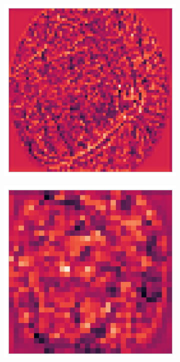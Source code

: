 \begin{figure}
\begin{subfigure}[b]{0.19\textwidth}
    \end{subfigure}
    \hfill
          \begin{subfigure}[b]{0.19\textwidth}
         \centering
         \includegraphics[width=\textwidth, height=\textwidth]{figures/chapter6/features/10988_left/10988_left_2.png}
    \end{subfigure}
    \hfill
    \begin{subfigure}[b]{0.19\textwidth}
         \centering
         \includegraphics[width=\textwidth, height=\textwidth]{figures/chapter6/features/10988_left/10988_left_3.png}

\end{subfigure}
\end{figure}
